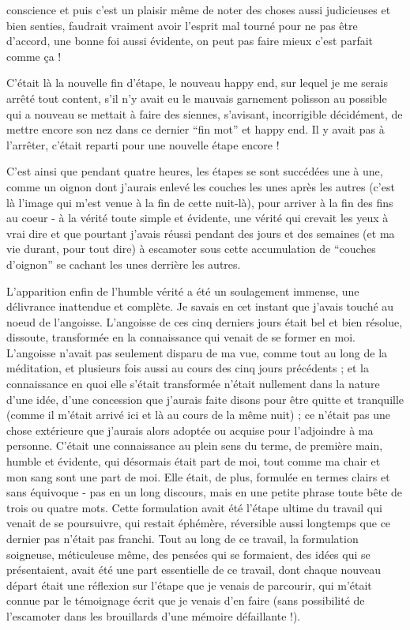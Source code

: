 conscience et puis c'est un plaisir même de noter des choses aussi judicieuses et bien senties, faudrait vraiment avoir l'esprit mal tourné pour ne pas être d'accord, une bonne foi aussi évidente, on peut pas faire mieux c'est parfait comme ça !

C'était là la nouvelle fin d'étape, le nouveau happy end, sur lequel je me serais arrêté tout content, s'il n'y avait eu le mauvais garnement polisson au possible qui a nouveau se mettait à faire des siennes, s'avisant, incorrigible décidément, de mettre encore son nez dans ce dernier ``fin mot'' et happy end. Il y avait pas à l'arrêter, c'était reparti pour une nouvelle étape encore !

C'est ainsi que pendant quatre heures, les étapes se sont succédées une à une, comme un oignon dont j'aurais enlevé les couches les unes après les autres (c'est là l'image qui m'est venue à la fin de cette nuit-là), pour arriver à la fin des fins au coeur - à la vérité toute simple et évidente, une vérité qui crevait les yeux à vrai dire et que pourtant j'avais réussi pendant des jours et des semaines (et ma vie durant, pour tout dire) à escamoter sous cette accumulation de ``couches d'oignon'' se cachant les unes derrière les autres.

L'apparition enfin de l'humble vérité a été un soulagement immense, une délivrance inattendue et complète. Je savais en cet instant que j'avais touché au noeud de l'angoisse. L'angoisse de ces cinq derniers jours était bel et bien résolue, dissoute, transformée en la connaissance qui venait de se former en moi. L'angoisse n'avait pas seulement disparu de ma vue, comme tout au long de la méditation, et plusieurs fois aussi au cours des cinq jours précédents ; et la connaissance en quoi elle s'était transformée n'était nullement dans la nature d'une idée, d'une concession que j'aurais faite disons pour être quitte et tranquille (comme il m'était arrivé ici et là au cours de la même nuit) ; ce n'était pas une chose extérieure que j'aurais alors adoptée ou acquise pour l'adjoindre à ma personne. C'était une connaissance au plein sens du terme, de première main, humble et évidente, qui désormais était part de moi, tout comme ma chair et mon sang sont une part de moi. Elle était, de plus, formulée en termes clairs et sans équivoque - pas en un long discours, mais en une petite phrase toute bête de trois ou quatre mots. Cette formulation avait été l'étape ultime du travail qui venait de se poursuivre, qui restait éphémère, réversible aussi longtemps que ce dernier pas n'était pas franchi. Tout au long de ce travail, la formulation soigneuse, méticuleuse même, des pensées qui se formaient, des idées qui se présentaient, avait été une part essentielle de ce travail, dont chaque nouveau départ était une réflexion sur l'étape que je venais de parcourir, qui m'était connue par le témoignage écrit que je venais d'en faire (sans possibilité de l'escamoter dans les brouillards d'une mémoire défaillante !).


